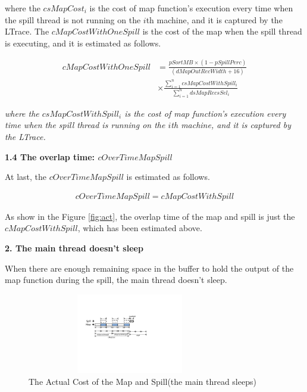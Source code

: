 where the $csMapCost_i$ is the cost of map function's execution every time when the spill thread is not running on the $i$th machine, and it is captured by the LTrace. The  $cMapCostWithOneSpill$ is the cost of the map when the spill thread is executing, and it is estimated as follows.
\begin{small}
\begin{equation}
\begin{split}
cMapCostWithOneSpill&=\frac{pSortMB\times (1-pSpillPerc)}{(dMapOutRecWidth+16)} \\
&\times\frac{\sum_{i=1}^ncsMapCostWithSpill_i}{\sum_{i=1}^ndsMapRecsSel_i} \nonumber
\end{split}
\end{equation}
\end{small}
\emph{where the $csMapCostWithSpill_i$ is the cost of map function's execution every time when the spill thread is running on the $i$th machine, and it is captured by the LTrace.}

\noindent\textbf{1.4 The overlap time: $cOverTimeMapSpill$}

At last, the $cOverTimeMapSpill$ is estimated as follows.
\begin{small}
\begin{equation}
\begin{split}
cOverTimeMapSpill=cMapCostWithSpill
\end{split}
\end{equation}
\end{small}
As show in the Figure \ref{fig:act}, the overlap time of the map and spill is just the $cMapCostWithSpill$, which has been estimated above.

\noindent\textbf{2. The main thread doesn't sleep} 

When there are enough remaining space in the buffer to hold the output of the map function during the spill, the main thread doesn't sleep.
\begin{figure}[htbp]
\centering
\includegraphics[height=3.5cm, width=9cm]{model2}
\caption{The Actual Cost of the Map and Spill(the main thread  sleeps)}
\label{sleeps}
\end{figure}

